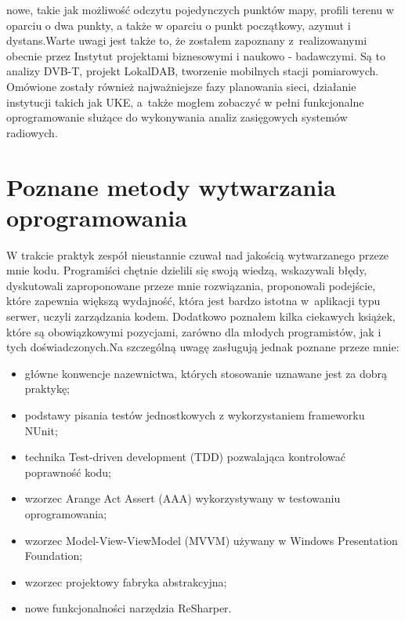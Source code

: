 \documentclass[12pt, a4paper, oneside]{article}
\begin{document}
nowe, takie jak możliwość odczytu pojedynczych punktów mapy, profili terenu w oparciu o dwa punkty, a także w oparciu o punkt początkowy, azymut i dystans.\newline \indent Warte uwagi jest także to, że zostałem zapoznany z~realizowanymi obecnie przez Instytut projektami biznesowymi i naukowo - badawczymi. Są to analizy DVB-T, projekt LokalDAB, tworzenie mobilnych stacji pomiarowych. Omówione zostały również najważniejsze fazy planowania sieci, działanie instytucji takich jak UKE, a~także mogłem zobaczyć w pełni funkcjonalne oprogramowanie służące do wykonywania analiz zasięgowych systemów radiowych.
\section{Poznane metody wytwarzania oprogramowania}
\indent\indent W trakcie praktyk zespół nieustannie czuwał nad jakością wytwarzanego przeze mnie kodu. Programiści chętnie dzielili się swoją wiedzą, wskazywali błędy, dyskutowali zaproponowane przeze mnie rozwiązania, proponowali podejście, które zapewnia większą wydajność, która jest bardzo istotna w~aplikacji typu serwer, uczyli zarządzania kodem. Dodatkowo poznałem kilka ciekawych książek, które są obowiązkowymi pozycjami, zarówno dla młodych programistów, jak i tych doświadczonych.\newline \indent Na szczególną uwagę zasługują jednak poznane przeze mnie:
\begin{itemize}
\item główne konwencje nazewnictwa, których stosowanie uznawane jest za dobrą praktykę;
\item podstawy pisania testów jednostkowych z wykorzystaniem frameworku NUnit;
\item technika Test-driven development (TDD) pozwalająca kontrolować poprawność kodu;
\item wzorzec Arange Act Assert (AAA) wykorzystywany w testowaniu oprogramowania;
\item wzorzec Model-View-ViewModel (MVVM) używany w Windows Presentation Foundation;
\item wzorzec projektowy fabryka abstrakcyjna;
\item nowe funkcjonalności narzędzia ReSharper.	
\end{itemize}
\end{document}
